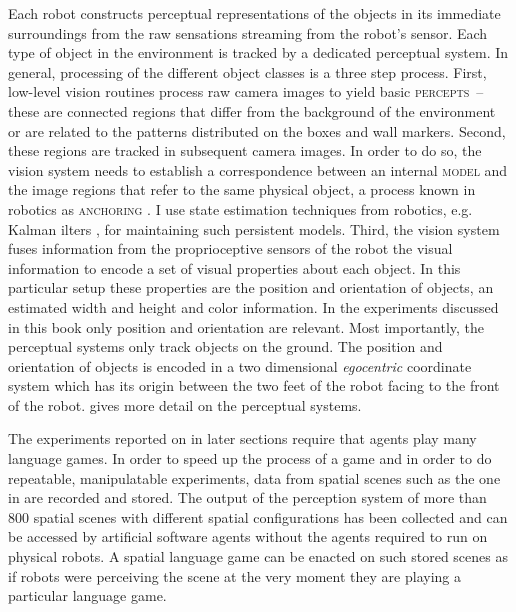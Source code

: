 Each robot constructs perceptual representations of the objects in its
immediate surroundings from the raw sensations streaming from the
robot's sensor. Each type of object in the environment is tracked
by a dedicated perceptual system. In general, processing of 
the different object classes is  a three step process.
First, low-level vision routines process raw camera
images to yield basic \textsc{percepts}~-- these are connected regions that
differ from the background of the environment or are related to 
the patterns distributed on the boxes and wall markers.
Second, these regions are tracked in subsequent
camera images. In order to do so, the vision system needs to establish a
correspondence between an internal \textsc{model} and the image
regions that refer to the same physical object, a process known in
robotics as \textsc{anchoring} \citep{coradeschi2003anchoring}. 
I use state estimation techniques from robotics, e.g. Kalman ilters 
\citep{kalman1960linear}, 
for maintaining such persistent models. Third, the vision system 
fuses information from the proprioceptive sensors of the robot
the visual information to encode a set of visual properties about each object. 
In this particular setup these properties are the position and orientation of objects, 
an estimated width and height and color information. In the experiments 
discussed in this book only position and orientation are relevant. 
Most importantly, the perceptual systems only track objects on the ground. 
The position and orientation of objects is encoded in 
a two dimensional \emph{egocentric} coordinate system which has 
its origin between the two feet of the robot facing to the front of the 
robot. \cite{spranger2008grounded} gives more detail on the 
perceptual systems.

The experiments reported on in later sections require that agents play many
language games. In order to speed up the process of a game and in order to
do repeatable, manipulatable experiments, data from spatial scenes  such as the one 
in  are recorded and stored. The output of the perception
system of more than 800 spatial scenes with different spatial configurations 
has been collected and can be accessed by artificial software agents without 
the agents required to run on physical robots.
A spatial language game can be enacted on such stored scenes as if robots 
were perceiving the scene at the very moment they are playing a particular 
language game.

